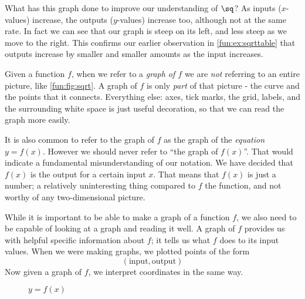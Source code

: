 \begin{pccexample}
	What has this graph done to improve our understanding of $\sq$?  As inputs
	($x$-values) increase, the outputs ($y$-values) increase too, although not at
	the same rate. In fact we can see that our graph is steep on its left, and less
	steep as we move to the right. This confirms our earlier observation in
	\cref{fun:ex:sqrttable} that outputs increase by smaller and smaller amounts
	as the input increases. 
	\end{pccexample}
	\begin{pccspecialcomment}
		Given a function $f$, when we refer to a \emph{graph of $f$} we are \emph{not}
		referring to an entire picture, like \cref{fun:fig:sqrt}. A graph of $f$ is only
		\emph{part} of that picture - the curve and the points that it connects.
		Everything else: axes, tick marks, the grid, labels, and the surrounding white
		space is just useful decoration, so that we can read the graph more easily.
		
		It is also common to refer to the graph of $f$ as the graph of the \emph{equation}
		$y=f(x)$. However we should never refer to ``the graph of $f(x)$''. That would
		indicate a fundamental misunderstanding of our notation. We have decided that $f(x)$
		is the output for a certain input $x$. That means that $f(x)$ is just a number; a
		relatively uninteresting thing compared to $f$ the function, and not worthy of
		any two-dimensional picture.
	\end{pccspecialcomment}
	
	While it is important to be able to make a graph of a function $f$, we also need to be capable of looking at a graph and reading it well. A graph of $f$ provides us with helpful specific information about $f$; it tells us what $f$ does to its input values. When we were making graphs, we plotted points of the form 
	\[
		(\text{input},\text{output})
	\]
	Now given a graph of $f$, we interpret coordinates in the same way.
	
	\begin{figure}[!htb]
		\centering
		\caption{$y=f(x)$}
		\label{fun:fig:readgraph}
	\end{figure}%
	
